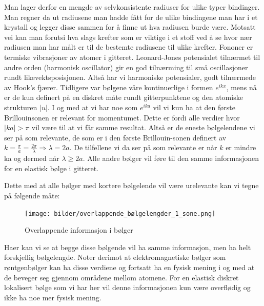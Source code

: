 \documentclass{article}
\begin{document}
Man lager derfor en mengde av selvkonsistente radiuser for ulike typer bindinger. Man regner da ut radiusene man hadde fått for de ulike bindingene man har i et krystall og legger disse sammen for å finne ut hva radiusen burde være. Motsatt vei kan man forutsi hva slags krefter som er viktige i et stoff ved å se hvor nær radiusen man har målt er til de bestemte radiusene til ulike krefter.
\nyside
{}
Fononer er termiske vibrasjoner av atomer i gitteret. Leonard-Jones potensialet tilnærmet til andre orden (harmonisk oscillator) gir en god tilnærming til små oscillasjoner rundt likevektsposisjonen. Altså har vi harmoniske potensialer, godt tilnærmede av Hook's fjærer. Tidligere var bølgene våre kontinuerlige i formen $e^{ikx}$, mens nå er de kun definert på en diskret måte rundt gitterpunktene og den atomiske strukturen $|u|$. I og med at vi har noe som $e^{ika}$ vil vi kun ha at den første Brillouinsonen er relevant for momentumet. Dette er fordi alle verdier hvor $|ka| > \pi$ vil være til at vi får samme resultat. Altså er de eneste bølgelendene vi ser på som relevante, de som er i den første Brillouin-sonen definert av $k = \frac{\pi}{a} = \frac{2\pi}{\lambda} \Rightarrow \lambda = 2a$. De tilfellene vi da ser på som relevante er når $k$ er mindre ka og dermed når $\lambda \geq 2a$. Alle andre bølger vil føre til den samme informasjonen for en elastisk bølge i gitteret.

Dette med at alle bølger med kortere bølgelende vil være urelevante kan vi tegne på følgende måte:
\begin{figure}[H]
    \centering
    \texttt{[image: bilder/overlappende\_bølgelengder\_1\_sone.png]}
    \caption{Overlappende informasjon i bølger}
    \label{fig:overlappende_bølgelengder_1_sone}
\end{figure}
Haer kan vi se at begge disse bølgende vil ha samme informasjon, men ha helt forskjellig bølgelengde. Noter derimot at elektromagnetiske bølger som røntgenbølger kan ha disse verdiene og fortsatt ha en fysisk mening i og med at de beveger seg gjennom områdene mellom atomene. For en elastisk diskret lokalisert bølge som vi har her vil denne informasjonen kun være overflødig og ikke ha noe mer fysisk mening.
\end{document}

